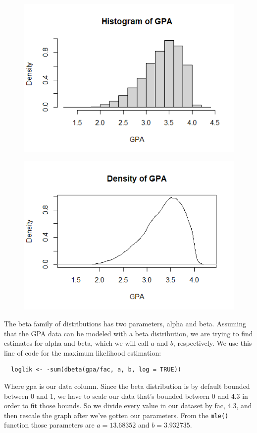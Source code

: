 \documentclass[12pt, a4paper, oneside]{report}
\begin{document}
\begin{figure}[h]
  \centering
  \includegraphics[width=0.7\linewidth]{betaHist.png}
\end{figure}

\begin{figure}[h]
  \centering
  \includegraphics[width=0.7\linewidth]{betaDensity.png}
\end{figure}

The beta family of distributions has two parameters, alpha and beta. Assuming that the GPA data can be modeled with a beta distribution, we are trying to find estimates for alpha and beta, which we will call $a$ and $b$, respectively. 
We use this line of code for the maximum likelihood estimation:

\begin{lstlisting}
  loglik <- -sum(dbeta(gpa/fac, a, b, log = TRUE))
\end{lstlisting}

Where gpa is our data column. Since the beta distribution is by default bounded between 0 and 1, we have to scale our data that's bounded between 0 and 4.3 in order to fit those bounds. So we divide every value in our dataset by fac, 4.3, and then rescale the graph after we’ve gotten our parameters. From the \lstinline{mle()} function those parameters are $a = 13.68352$ and $b = 3.932735$.
\end{document}
